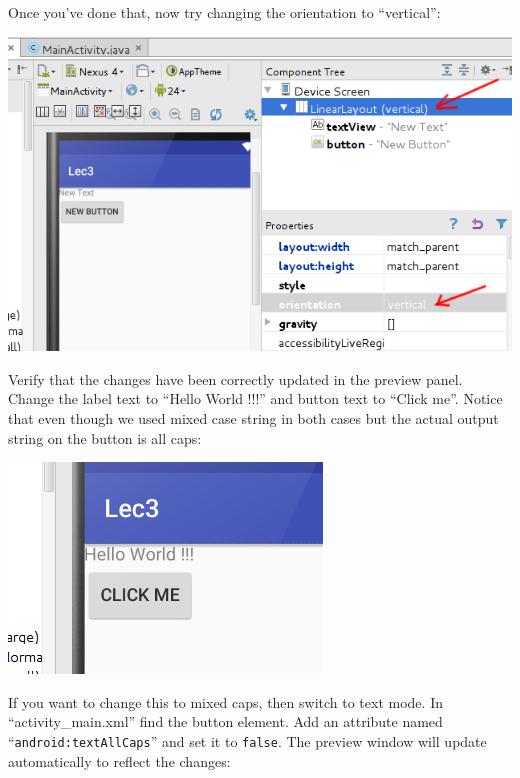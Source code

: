 Once you've done that, now try changing the orientation to ``vertical'':

\begin{center}
	\includegraphics[scale=0.4]{chapters/ch03/images/6_linear_layout}
\end{center} 

Verify that the changes have been correctly updated in the preview panel.\\

Change the label text to ``Hello World !!!'' and button text to ``Click me''. Notice that even though we used mixed case string in both cases but the actual output string on the button is all caps:

\begin{center}
	\includegraphics[scale=0.4]{chapters/ch03/images/7_change_text}
\end{center} 

If you want to change this to mixed caps, then switch to text mode. In ``activity\_main.xml'' find the button element. Add an attribute named ``\texttt{android:textAllCaps}'' and set it to \texttt{false}. The preview window will update automatically to reflect the changes:

